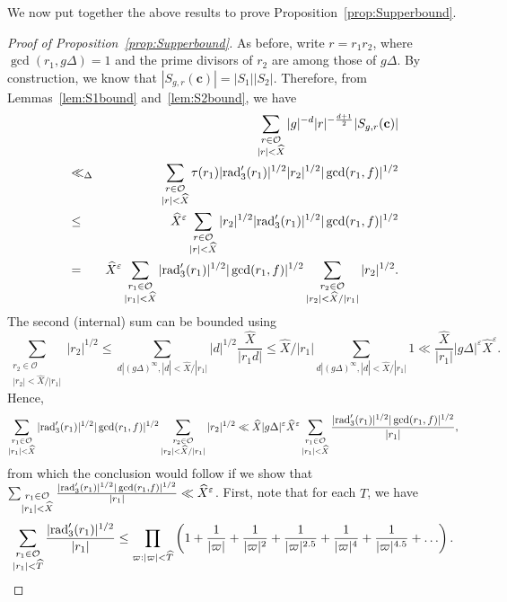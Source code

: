 \documentclass[11pt]{amsart}
\theoremstyle{plain}
\theoremstyle{plain}
\renewcommand{\vec}[1]{\mathbf{#1}}
\theoremstyle{remark}
\theoremstyle{definition}
\newcommand{\rad}{\textup{rad}'_3}
\renewcommand{\hat}{\widehat}
\begin{document}
We now put together the above results to prove Proposition~\ref{prop:Supperbound}.
\begin{proof}[Proof of Proposition~\ref{prop:Supperbound}] 
As before, write $r=r_1r_2$, where $\gcd(r_1,g\Delta)=1$ and the prime divisors of $r_2$ are among those of $g\Delta$. By construction, we know that $|S_{g,r}(\vec{c})|=|S_1||S_2|$. Therefore, from Lemmas~\ref{lem:S1bound} and~\ref{lem:S2bound}, we have
\begin{eqnarray*}&&\sum_{\substack{r\in\mathcal{O}\\|r|<\hat{X}}}|g|^{-d}|r|^{-\frac{d+1}{2}}|S_{g,r}(\vec{c})|\\&\ll_{\Delta}& \sum_{\substack{r\in\mathcal{O}\\|r|<\hat{X}}}\tau(r_1)|\rad(r_1)|^{1/2}|r_2|^{1/2}|\gcd(r_1,f)|^{1/2}\\ &\leq& \hat{X}^{\varepsilon}\sum_{\substack{r\in\mathcal{O}\\|r|<\hat{X}}}|r_2|^{1/2}|\rad(r_1)|^{1/2}|\gcd(r_1,f)|^{1/2}\\&=&\hat{X}^{\varepsilon}\sum_{\substack{r_1\in\mathcal{O}\\|r_1|<\hat{X}}}|\rad(r_1)|^{1/2}|\gcd(r_1,f)|^{1/2}\sum_{\substack{r_2\in\mathcal{O}\\|r_2|<\hat{X}/|r_1|}}|r_2|^{1/2}.
\end{eqnarray*}
The second (internal) sum can be bounded using
\[\sum_{\substack{r_2\in\mathcal{O}\\|r_2|<\hat{X}/|r_1|}}|r_2|^{1/2}\leq\sum_{d|(g\Delta)^{\infty}, |d|<\hat{X}/|r_1|} |d|^{1/2} \frac{\hat{X}}{|r_1d|} \leq \hat{X}/|r_1|\sum_{d|(g\Delta)^{\infty}, |d|<\hat{X}/|r_1|} 1
 \ll \frac{\hat{X}}{|r_1|}  |g\Delta|^{\varepsilon}\hat{X}^{\varepsilon}.\]
Hence,
\[\sum_{\substack{r_1\in\mathcal{O}\\|r_1|<\hat{X}}}|\rad(r_1)|^{1/2}|\gcd(r_1,f)|^{1/2}\sum_{\substack{r_2\in\mathcal{O}\\|r_2|<\hat{X}/|r_1|}}|r_2|^{1/2}\ll \hat{X}|g\Delta|^{\varepsilon}\hat{X}^{\varepsilon}\sum_{\substack{r_1\in\mathcal{O}\\|r_1|<\hat{X}}}\frac{|\rad(r_1)|^{1/2}|\gcd(r_1,f)|^{1/2}}{|r_1|},\]
from which the conclusion would follow if we show that $\sum_{\substack{r_1\in\mathcal{O}\\|r_1|<\hat{X}}}\frac{|\rad(r_1)|^{1/2}|\gcd(r_1,f)|^{1/2}}{|r_1|}\ll \hat{X}^{\varepsilon}$. First, note that for each $T$, we have
\[\sum_{\substack{r_1\in\mathcal{O}\\|r_1|<\hat{T}}}\frac{|\rad(r_1)|^{1/2}}{|r_1|}\leq\prod_{\varpi:|\varpi|<\hat{T}}\left(1+\frac{1}{|\varpi|}+\frac{1}{|\varpi|^2}+\frac{1}{|\varpi|^{2.5}}+\frac{1}{|\varpi|^4}+\frac{1}{|\varpi|^{4.5}}+\hdots\right).\]

\end{proof}
\end{document}
